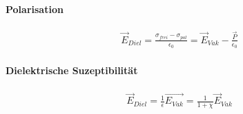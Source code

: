 	\paragraph{Polarisation}\begin{align} \label{eqn:Polarisation Überlagerung}
\vec{E}_{Diel} = \frac{\sigma_{frei} - \sigma_{pol}}{\epsilon_0} = \vec{E}_{Vak} - \frac{\vec{P}}{\epsilon_0}
\end{align}

\paragraph{Dielektrische Suzeptibilität}
\begin{align} \label{eqn:Dielektrika Feldstärke}
\boxed{\vec{E}_{Diel} = \frac{1}{\epsilon} \vec{E_{Vak}} = \frac{1}{1+ \chi} \vec{E}_{Vak}}
\end{align}
